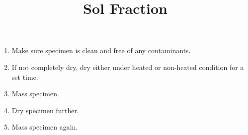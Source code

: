 \documentclass[11pt, oneside]{article}   	%
\title{Sol Fraction}
\begin{document}
\maketitle 							%
\date{}							%

\begin{enumerate}

\item Make sure specimen is clean and free of any contaminants.
\item If not completely dry, dry either under heated or non-heated condition for a set time.
\item Mass specimen.
\item Dry specimen further.
\item Mass specimen again.

\end{enumerate}
\end{document}
